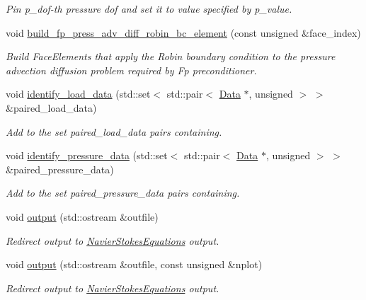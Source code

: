 \begin{DoxyCompactItemize}
\begin{DoxyCompactList}\small\item\em Pin p\+\_\+dof-\/th pressure dof and set it to value specified by p\+\_\+value. \end{DoxyCompactList}\item 
void \hyperlink{classoomph_1_1TTaylorHoodElement_a3ed1ee43804db6acde4aa996a0e878c0}{build\+\_\+fp\+\_\+press\+\_\+adv\+\_\+diff\+\_\+robin\+\_\+bc\+\_\+element} (const unsigned \&face\+\_\+index)
\begin{DoxyCompactList}\small\item\em Build Face\+Elements that apply the Robin boundary condition to the pressure advection diffusion problem required by Fp preconditioner. \end{DoxyCompactList}\item 
void \hyperlink{classoomph_1_1TTaylorHoodElement_adfc82bce12e96bb4e93e855dd16ac195}{identify\+\_\+load\+\_\+data} (std\+::set$<$ std\+::pair$<$ \hyperlink{classoomph_1_1Data}{Data} $\ast$, unsigned $>$ $>$ \&paired\+\_\+load\+\_\+data)
\begin{DoxyCompactList}\small\item\em Add to the set {\ttfamily paired\+\_\+load\+\_\+data} pairs containing. \end{DoxyCompactList}\item 
void \hyperlink{classoomph_1_1TTaylorHoodElement_ab1d985e874073ad6900655563dbfacab}{identify\+\_\+pressure\+\_\+data} (std\+::set$<$ std\+::pair$<$ \hyperlink{classoomph_1_1Data}{Data} $\ast$, unsigned $>$ $>$ \&paired\+\_\+pressure\+\_\+data)
\begin{DoxyCompactList}\small\item\em Add to the set {\ttfamily paired\+\_\+pressure\+\_\+data} pairs containing. \end{DoxyCompactList}\item 
void \hyperlink{classoomph_1_1TTaylorHoodElement_ac811dc5fb7c1dcad508cf2e4759bef32}{output} (std\+::ostream \&outfile)
\begin{DoxyCompactList}\small\item\em Redirect output to \hyperlink{classoomph_1_1NavierStokesEquations}{Navier\+Stokes\+Equations} output. \end{DoxyCompactList}\item 
void \hyperlink{classoomph_1_1TTaylorHoodElement_a42a3843e4b3ee8e02c6f992b4c0284a8}{output} (std\+::ostream \&outfile, const unsigned \&nplot)
\begin{DoxyCompactList}\small\item\em Redirect output to \hyperlink{classoomph_1_1NavierStokesEquations}{Navier\+Stokes\+Equations} output. \end{DoxyCompactList}\item 

\end{DoxyCompactItemize}
